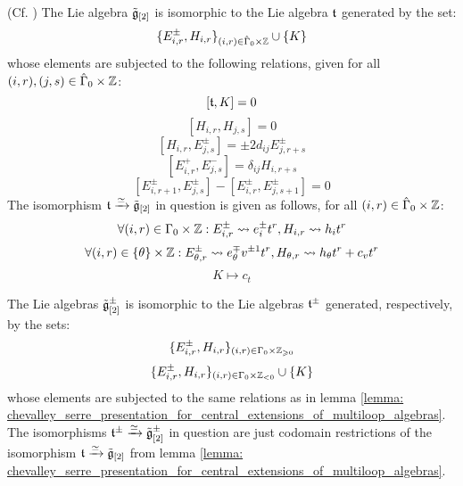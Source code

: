         \begin{lemma} \label{lemma: chevalley_serre_presentation_for_central_extensions_of_multiloop_algebras}
            (Cf. \cite[Proposition 6.6]{wendlandt_formal_shift_operators_on_yangian_doubles}) The Lie algebra $\tilde{\mathfrak{g}}_{[2]}$ is isomorphic to the Lie algebra $\mathfrak{t}$ generated by the set:
                $$\{ E_{i, r}^{\pm}, H_{i, r} \}_{(i, r) \in \hat{\Gamma}_0 \x \Z} \cup \{ K \}$$
            whose elements are subjected to the following relations, given for all $(i, r), (j, s) \in \hat{\Gamma}_0 \x \Z$:
                $$[\mathfrak{t}, K] = 0$$
                $$[ H_{i, r}, H_{j, s} ] = 0$$
                $$[ H_{i, r}, E_{j, s}^{\pm} ] = \pm 2 d_{ij} E_{j, r + s}^{\pm}$$
                $$[ E_{i, r}^+, E_{j, s}^- ] = \delta_{ij} H_{i, r + s}$$
                $$[ E_{i, r + 1}^{\pm}, E_{j, s}^{\pm} ] - [ E_{i, r}^{\pm}, E_{j, s + 1}^{\pm} ] = 0$$
            The isomorphism $\mathfrak{t} \xrightarrow[]{\simeq} \tilde{\mathfrak{g}}_{[2]}$ in question is given as follows, for all $(i, r) \in \hat{\Gamma}_0 \x \Z$:
                $$\forall (i, r) \in \Gamma_0 \x \Z: E_{i, r}^{\pm} \mapsto e_i^{\pm} t^r, H_{i, r} \mapsto h_i t^r$$
                $$\forall (i, r) \in \{\theta\} \x \Z: E_{\theta, r}^{\pm} \mapsto e_{\theta}^{\mp} v^{\pm 1} t^r, H_{\theta, r} \mapsto h_{\theta} t^r + c_v t^r$$
                $$K \mapsto c_t$$
        \end{lemma}
        \begin{corollary} \label{coro: chevalley_serre_presentation_for_central_extensions_of_multiloop_algebras}
            The Lie algebras $\tilde{\mathfrak{g}}_{[2]}^{\pm}$ is isomorphic to the Lie algebras $\mathfrak{t}^{\pm}$ generated, respectively, by the sets:
                $$\{ E_{i, r}^{\pm}, H_{i, r} \}_{(i, r) \in \Gamma_0 \x \Z_{\geq 0}}$$
                $$\{ E_{i, r}^{\pm}, H_{i, r} \}_{(i, r) \in \Gamma_0 \x \Z_{< 0}} \cup \{K\}$$
            whose elements are subjected to the same relations as in lemma \ref{lemma: chevalley_serre_presentation_for_central_extensions_of_multiloop_algebras}. The isomorphisms $\mathfrak{t}^{\pm} \xrightarrow[]{\simeq} \tilde{\mathfrak{g}}_{[2]}^{\pm}$ in question are just codomain restrictions of the isomorphism $\mathfrak{t} \xrightarrow[]{\simeq} \tilde{\mathfrak{g}}_{[2]}$ from lemma \ref{lemma: chevalley_serre_presentation_for_central_extensions_of_multiloop_algebras}.
        \end{corollary}

